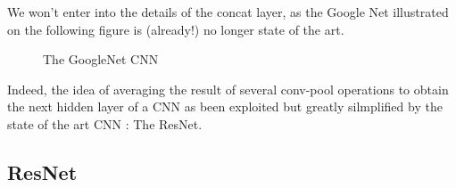 We won't enter into the details of the concat layer, as the Google Net illustrated on the following figure is (already!) no longer state of the art.


\begin{figure}[H]
\begin{center}
\caption{The GoogleNet CNN}
\end{center}
\end{figure}

Indeed, the idea of averaging the result of several conv-pool operations to obtain the next hidden layer of a CNN as been exploited but greatly silmplified by the state of the art CNN : The ResNet.

\subsection{ResNet}

